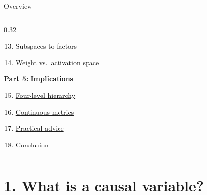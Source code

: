 \documentclass[aspectratio=169,11pt]{beamer}
\begin{document}
\begin{frame}{Overview}
\begin{columns}[T]
\begin{column}{0.32\textwidth}
\begin{enumerate}
  \setcounter{enumi}{12}
  \item \hyperlink{sec12b}{Subspaces to factors}
  \item \hyperlink{sec12c}{Weight vs.\ activation space}
\end{enumerate}
\vspace{0.5em}
\textbf{\hyperlink{part5}{Part 5: Implications}}
\begin{enumerate}
  \setcounter{enumi}{14}
  \item \hyperlink{sec13}{Four-level hierarchy}
  \item \hyperlink{sec14}{Continuous metrics}
  \item \hyperlink{sec15}{Practical advice}
  \item \hyperlink{sec16}{Conclusion}
\end{enumerate}
\end{column}
\end{columns}
\end{frame}


\begin{frame}[plain]
\hypertarget{part1}{}
\vfill
\begin{center}
  \setlength{\fboxrule}{2.5pt}%
\end{center}
\vfill
\end{frame}



\hypertarget{sec1}{}
\section{1. What is a causal variable?}

\end{document}
